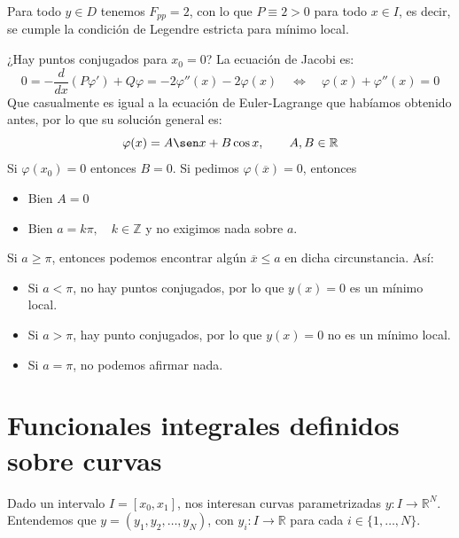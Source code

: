 \begin{ejemplo}
\begin{enumerate}
            Para todo $y\in D$ tenemos $F_{pp} = 2$, con lo que $P \equiv 2 > 0$ para todo $x\in I$, es decir, se cumple la condición de Legendre estricta para mínimo local.

            ¿Hay puntos conjugados para $x_0 = 0$? La ecuación de Jacobi es:
            \begin{equation*}
                0 = -\frac{d}{dx}(P\varphi') + Q\varphi = -2\varphi''(x) -2\varphi(x) \quad\Longleftrightarrow\quad \varphi(x) + \varphi''(x) = 0
            \end{equation*}
            Que casualmente es igual a la ecuación de Euler-Lagrange que habíamos obtenido antes, por lo que su solución general es:
            \begin{equation*}
                \varphi(x) = A\sen x + B\cos x, \qquad A,B\in \mathbb{R}
            \end{equation*}
            Si $\varphi(x_0) = 0$ entonces $B=0$. Si pedimos $\varphi(\overline{x}) = 0$, entonces
            \begin{itemize}
                \item Bien $A = 0$
                \item Bien $a=k\pi, \quad k\in \mathbb{Z}$ y no exigimos nada sobre $a$.
            \end{itemize}
            Si $a\geq \pi$, entonces podemos encontrar algún $\overline{x}\leq a$ en dicha circunstancia. Así:
            \begin{itemize}
                \item Si $a<\pi$, no hay puntos conjugados, por lo que $y(x) = 0$ es un mínimo local.
                \item Si $a>\pi$, hay punto conjugados, por lo que $y(x) = 0$ no es un mínimo local.
                \item Si $a=\pi$, no podemos afirmar nada.
            \end{itemize}
    \end{enumerate}
\end{ejemplo}

\section{Funcionales integrales definidos sobre curvas}
\noindent
Dado un intervalo $I = [x_0,x_1]$, nos interesan curvas parametrizadas $y:I\to \mathbb{R}^N$. Entendemos que $y = (y_1,y_2,\ldots,y_N)$, con $y_i:I\to \mathbb{R}$ para cada $i \in \{1,\ldots,N\}$. 

